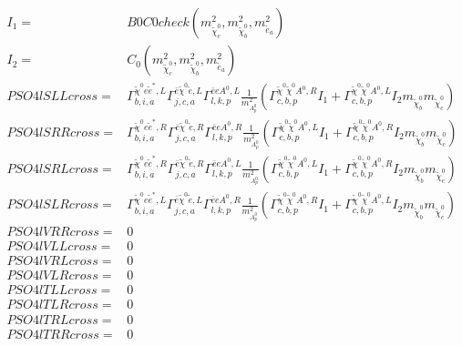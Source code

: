 \documentclass[A4,landscape]{article}
\begin{document}
\begin{align} 
I_1= & B0C0check(m^2_{\tilde{\chi}^0_{{c}}}, m^2_{\tilde{\chi}^0_{{b}}}, m^2_{\tilde{e}_{{a}}}) \\ 
I_2= & C_0(m^2_{\tilde{\chi}^0_{{c}}}, m^2_{\tilde{\chi}^0_{{b}}}, m^2_{\tilde{e}_{{a}}}) \\ 
  PSO4lSLLcross= &  \Gamma^{\tilde{\chi}^0 e \tilde{e}^*,L}_{b, i, a} \Gamma^{\bar{e}\tilde{\chi}^0 \tilde{e} ,L}_{j, c, a} \Gamma^{\bar{e}e A^0 ,L}_{l, k, p} \frac{1}{m^2_{A^0_{{p}}}} (\Gamma^{\tilde{\chi}^0 \tilde{\chi}^0 A^0 ,R}_{c, b, p} I_1 + \Gamma^{\tilde{\chi}^0 \tilde{\chi}^0 A^0 ,L}_{c, b, p} I_2 m_{\tilde{\chi}^0_{{b}}} m_{\tilde{\chi}^0_{{c}}}) \\ 
  PSO4lSRRcross= &  \Gamma^{\tilde{\chi}^0 e \tilde{e}^*,R}_{b, i, a} \Gamma^{\bar{e}\tilde{\chi}^0 \tilde{e} ,R}_{j, c, a} \Gamma^{\bar{e}e A^0 ,R}_{l, k, p} \frac{1}{m^2_{A^0_{{p}}}} (\Gamma^{\tilde{\chi}^0 \tilde{\chi}^0 A^0 ,L}_{c, b, p} I_1 + \Gamma^{\tilde{\chi}^0 \tilde{\chi}^0 A^0 ,R}_{c, b, p} I_2 m_{\tilde{\chi}^0_{{b}}} m_{\tilde{\chi}^0_{{c}}}) \\ 
  PSO4lSRLcross= &  \Gamma^{\tilde{\chi}^0 e \tilde{e}^*,R}_{b, i, a} \Gamma^{\bar{e}\tilde{\chi}^0 \tilde{e} ,R}_{j, c, a} \Gamma^{\bar{e}e A^0 ,L}_{l, k, p} \frac{1}{m^2_{A^0_{{p}}}} (\Gamma^{\tilde{\chi}^0 \tilde{\chi}^0 A^0 ,L}_{c, b, p} I_1 + \Gamma^{\tilde{\chi}^0 \tilde{\chi}^0 A^0 ,R}_{c, b, p} I_2 m_{\tilde{\chi}^0_{{b}}} m_{\tilde{\chi}^0_{{c}}}) \\ 
  PSO4lSLRcross= &  \Gamma^{\tilde{\chi}^0 e \tilde{e}^*,L}_{b, i, a} \Gamma^{\bar{e}\tilde{\chi}^0 \tilde{e} ,L}_{j, c, a} \Gamma^{\bar{e}e A^0 ,R}_{l, k, p} \frac{1}{m^2_{A^0_{{p}}}} (\Gamma^{\tilde{\chi}^0 \tilde{\chi}^0 A^0 ,R}_{c, b, p} I_1 + \Gamma^{\tilde{\chi}^0 \tilde{\chi}^0 A^0 ,L}_{c, b, p} I_2 m_{\tilde{\chi}^0_{{b}}} m_{\tilde{\chi}^0_{{c}}}) \\ 
  PSO4lVRRcross= & 0 \\ 
  PSO4lVLLcross= & 0 \\ 
  PSO4lVRLcross= & 0 \\ 
  PSO4lVLRcross= & 0 \\ 
  PSO4lTLLcross= & 0 \\ 
  PSO4lTLRcross= & 0 \\ 
  PSO4lTRLcross= & 0 \\ 
  PSO4lTRRcross= & 0 \\ 
\end{align} 
\end{document}
